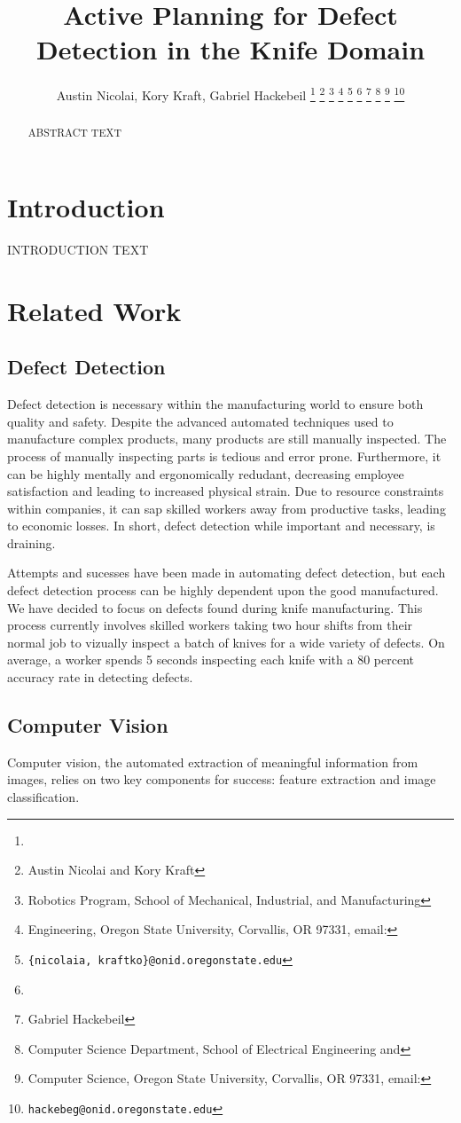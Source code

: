 \documentclass[letterpaper, 10 pt, conference]{ieeeconf}  %
\title{\LARGE \bf 
Active Planning for Defect Detection in the Knife Domain
}
\author{Austin Nicolai, Kory Kraft, Gabriel Hackebeil%
\thanks{\hrulefill}
\thanks{Austin Nicolai and Kory Kraft}
\thanks{Robotics Program, School of Mechanical, Industrial, and Manufacturing}
\thanks{Engineering, Oregon State University, Corvallis, OR 97331, email: }
\thanks{{\tt\small \{nicolaia, kraftko\}@onid.oregonstate.edu}}
\thanks{\hfill}
\thanks{Gabriel Hackebeil}
\thanks{Computer Science Department, School of Electrical Engineering and}
\thanks{Computer Science, Oregon State University, Corvallis, OR 97331, email: }
\thanks{{\tt\small hackebeg@onid.oregonstate.edu}}
}
\begin{document}
\maketitle
\thispagestyle{empty}
\pagestyle{empty}

\begin{abstract}
ABSTRACT TEXT
\end{abstract}


\section{Introduction}

INTRODUCTION TEXT\cite{placeholder}

\section{Related Work}

\subsection{Defect Detection}
Defect detection is necessary within the manufacturing world to ensure both quality and safety. Despite the advanced automated techniques used to manufacture complex products, many products are still manually inspected. The process of manually inspecting parts is tedious and error prone. Furthermore, it can be highly mentally and ergonomically redudant, decreasing employee satisfaction and leading to increased physical strain. Due to resource constraints within companies, it can sap skilled workers away from productive tasks, leading to economic losses. In short, defect detection while important and necessary, is draining.

Attempts and sucesses have been made in automating defect detection, but each defect detection process can be highly dependent upon the good manufactured. We have decided to focus on defects found during knife manufacturing. This process currently involves skilled workers taking two hour shifts from their normal job to vizually inspect a batch of knives for a wide variety of defects. On average, a worker spends 5 seconds inspecting each knife with a 80 percent accuracy rate in detecting defects.

\subsection{Computer Vision}

Computer vision, the automated extraction of meaningful information from images, relies on two key components for success: feature extraction and image classification. 
\end{document}

